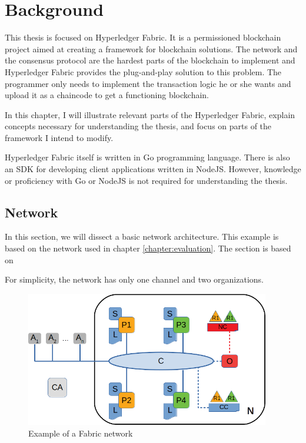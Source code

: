 \chapter{Background}
\label{chapter:background}

This thesis is focused on Hyperledger Fabric. It is a permissioned blockchain project aimed at creating a framework for blockchain solutions. The network and the consensus protocol are the hardest parts of the blockchain to implement and Hyperledger Fabric provides the plug-and-play solution to this problem. The programmer only needs to implement the transaction logic he or she wants and upload it as a chaincode to get a functioning blockchain.

In this chapter, I will illustrate relevant parts of the Hyperledger Fabric, explain concepts necessary for understanding the thesis, and focus on parts of the framework I intend to modify.

Hyperledger Fabric itself is written in Go programming language. There is also an SDK for developing client applications written in NodeJS.
However, knowledge or proficiency with Go or NodeJS is not required for understanding the thesis.

\section{Network}
\label{sec:network}

In this section, we will dissect a basic network architecture. This example is based on the network used in chapter \ref{chapter:evaluation}. The section is based on \cite{fabricdocs:network}

For simplicity, the network has only one channel and two organizations.

\vskip 0.5cm

\begin{figure}[hp]
\begin{center}
\includegraphics[width=0.95\textwidth]{figures/network}
\end{center}
\caption{Example of a Fabric network}
\label{fig:net}
\end{figure}

